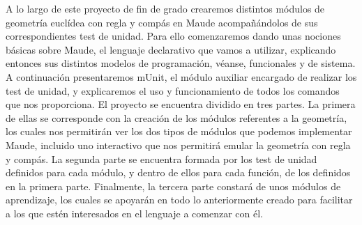 
A lo largo de este proyecto de fin de grado crearemos distintos módulos de geometría euclídea con regla y compás en Maude acompañándolos de sus correspondientes test de unidad. Para ello comenzaremos dando unas nociones básicas sobre Maude, el lenguaje declarativo que vamos a utilizar, explicando entonces sus distintos modelos de programación, véanse, funcionales y de sistema. A continuación presentaremos mUnit, el módulo auxiliar encargado de realizar los test de unidad, y explicaremos el uso y funcionamiento de todos los comandos que nos proporciona. El proyecto se encuentra dividido en tres partes. La primera de ellas se corresponde con la creación de los módulos referentes a la geometría, los cuales nos permitirán ver los dos tipos de módulos que podemos implementar Maude, incluido uno interactivo que nos permitirá emular la geometría con regla y compás. La segunda parte se encuentra formada por los test de unidad definidos para cada módulo, y dentro de ellos para cada función, de los definidos en la primera parte. Finalmente, la tercera parte constará de unos módulos de aprendizaje, los cuales se apoyarán en todo lo anteriormente creado para facilitar a los que estén interesados en el lenguaje a comenzar con él. 
